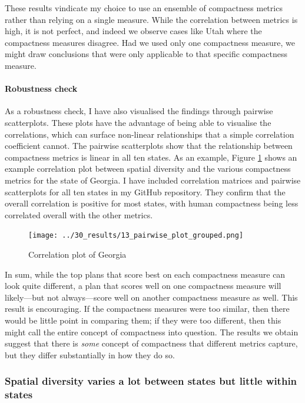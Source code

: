\documentclass[]{article}
\let\oldparagraph\paragraph
\renewcommand{\paragraph}[1]{\oldparagraph{#1}\mbox{}}
\begin{document}
These results vindicate my choice to use an ensemble of compactness
metrics rather than relying on a single measure. While the correlation
between metrics is high, it is not perfect, and indeed we observe cases
like Utah where the compactness measures disagree. Had we used only one
compactness measure, we might draw conclusions that were only applicable
to that specific compactness measure.

\hypertarget{robustness-check}{%
\paragraph{Robustness check}\label{robustness-check}}

As a robustness check, I have also visualised the findings through
pairwise scatterplots. These plots have the advantage of being able to
visualise the correlations, which can surface non-linear relationships
that a simple correlation coefficient cannot. The pairwise scatterplots
show that the relationship between compactness metrics is linear in all
ten states. As an example, Figure \ref{pairwise_plot_grouped} shows an
example correlation plot between spatial diversity and the various
compactness metrics for the state of Georgia. I have included
correlation matrices and pairwise scatterplots for all ten states in my
GitHub repository. They confirm that the overall correlation is positive
for most states, with human compactness being less correlated overall
with the other metrics.

\begin{figure}
\centering
\texttt{[image: ../30\_results/13\_pairwise\_plot\_grouped.png]}
\caption{Correlation plot of Georgia\label{pairwise_plot_grouped}}
\end{figure}

In sum, while the top plans that score best on each compactness measure
can look quite different, a plan that scores well on one compactness
measure will likely---but not always---score well on another compactness
measure as well. This result is encouraging. If the compactness measures
were too similar, then there would be little point in comparing them; if
they were too different, then this might call the entire concept of
compactness into question. The results we obtain suggest that there is
\emph{some} concept of compactness that different metrics capture, but
they differ substantially in how they do so.

\hypertarget{spatial-diversity-varies-a-lot-between-states-but-little-within-states}{%
\subsubsection{Spatial diversity varies a lot between states but little
within
states}\label{spatial-diversity-varies-a-lot-between-states-but-little-within-states}}
\end{document}
